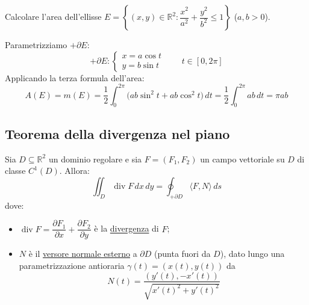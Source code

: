 \begin{esercizio}
Calcolare l'area dell'ellisse $E = \left\{ (x, y) \in \mathbb{R}^2 : \dfrac{x^2}{a^2} + \dfrac{y^2}{b^2} \le 1 \right\}$ ($a, b > 0$).

\begin{center}
\end{center}
Parametrizziamo $+\partial E$:
\[
+\partial E : \begin{cases} x = a \cos t \\ y = b \sin t \end{cases} \qquad t \in [0, 2\pi]
\]
Applicando la terza formula dell'area:
\[
A(E) = m(E) = \frac{1}{2} \int_0^{2\pi} \big( a b \sin^2 t + a b \cos^2 t \big)\, dt = \frac{1}{2} \int_0^{2\pi} ab\, dt = \pi a b
\]
\end{esercizio}

\subsection{Teorema della divergenza nel piano}

\begin{theorem}
Sia $D \subseteq \mathbb{R}^2$ un dominio regolare e sia $F = (F_1, F_2)$ un campo vettoriale su $D$ di classe $C^1(D)$. Allora:
\[
\boxed{\iint_D \operatorname{div} F\, dx\, dy = \oint_{+\partial D} \langle F, N \rangle\, ds}
\]
dove:
\begin{itemize}
    \item $\operatorname{div} F = \dfrac{\partial F_1}{\partial x} + \dfrac{\partial F_2}{\partial y}$ è la \underline{divergenza} di $F$;
    \item $N$ è il \underline{versore normale esterno} a $\partial D$ (punta fuori da $D$), dato lungo una parametrizzazione antioraria $\gamma(t) = (x(t), y(t))$ da
    \[
    N(t) = \frac{(y'(t), -x'(t))}{\sqrt{x'(t)^2 + y'(t)^2}}
    \]
\end{itemize}
\end{theorem}

